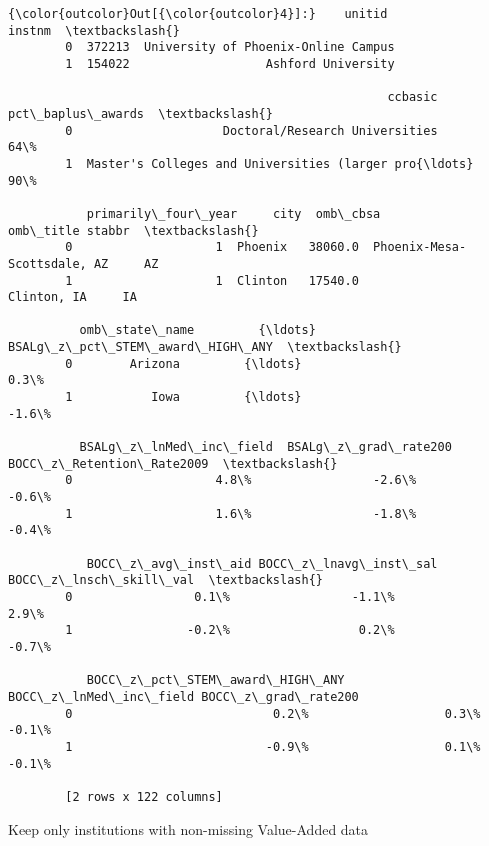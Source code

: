 \documentclass[11pt]{article}
\begin{document}
\begin{Verbatim}[commandchars=\\\{\}]
{\color{outcolor}Out[{\color{outcolor}4}]:}    unitid                               instnm  \textbackslash{}
        0  372213  University of Phoenix-Online Campus   
        1  154022                   Ashford University   
        
                                                     ccbasic pct\_baplus\_awards  \textbackslash{}
        0                     Doctoral/Research Universities               64\%   
        1  Master's Colleges and Universities (larger pro{\ldots}               90\%   
        
           primarily\_four\_year     city  omb\_cbsa                    omb\_title stabbr  \textbackslash{}
        0                    1  Phoenix   38060.0  Phoenix-Mesa-Scottsdale, AZ     AZ   
        1                    1  Clinton   17540.0                  Clinton, IA     IA   
        
          omb\_state\_name         {\ldots}          BSALg\_z\_pct\_STEM\_award\_HIGH\_ANY  \textbackslash{}
        0        Arizona         {\ldots}                                     0.3\%   
        1           Iowa         {\ldots}                                    -1.6\%   
        
          BSALg\_z\_lnMed\_inc\_field  BSALg\_z\_grad\_rate200 BOCC\_z\_Retention\_Rate2009  \textbackslash{}
        0                    4.8\%                 -2.6\%                     -0.6\%   
        1                    1.6\%                 -1.8\%                     -0.4\%   
        
           BOCC\_z\_avg\_inst\_aid BOCC\_z\_lnavg\_inst\_sal BOCC\_z\_lnsch\_skill\_val  \textbackslash{}
        0                 0.1\%                 -1.1\%                   2.9\%   
        1                -0.2\%                  0.2\%                  -0.7\%   
        
           BOCC\_z\_pct\_STEM\_award\_HIGH\_ANY BOCC\_z\_lnMed\_inc\_field BOCC\_z\_grad\_rate200  
        0                            0.2\%                   0.3\%               -0.1\%  
        1                           -0.9\%                   0.1\%               -0.1\%  
        
        [2 rows x 122 columns]
\end{Verbatim}
            
    Keep only institutions with non-missing Value-Added data
\end{document}
